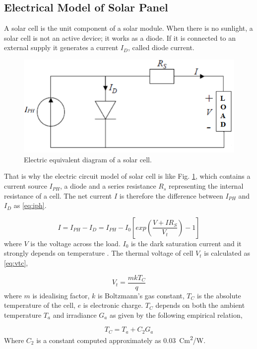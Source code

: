 \documentclass[journal]{IEEEtran/IEEEtran}
\newcommand{\figref}[1]{Fig. \ref{#1}}
\begin{document}
	\subsection{Electrical Model of Solar Panel}
	A solar cell is the unit component of a solar module. When there is no sunlight, a solar cell is not an active device; it works as a diode. If it is connected to an external supply it generates a current $I_D$, called diode current.
	\begin{figure}[!b]
		\centering
		\includegraphics[width=\linewidth]{cell_electric.png}
		\caption{Electric equivalent diagram of a solar cell.}
		\label{fig:solarcell}
	\end{figure}
	That is why the electric circuit model of solar cell is like \figref{fig:solarcell}, which contains a current source $I_{PH}$, a diode and a series resistance $R_s$ representing the internal resistance of a cell. The net current $I$ is therefore the difference between $I_{PH}$ and $I_D$ as \eqref{eq:iph}.
	
	\begin{equation}
	\label{eq:iph}
	I = I_{PH}-I_D = I_{PH}-I_0\left[exp\left(\frac{V+IR_S}{V_t}\right)-1\right] 
	\end{equation}
	where $V$ is the voltage across the load. $I_0$ is the dark saturation current and it strongly depends on temperature \cite{lorenzo}. The thermal voltage of cell $V_t$ is calculated as \eqref{eq:vtc},
	
	\begin{equation}
	\label{eq:vtc}
	V_t = \frac{mkT_C}{q}
	\end{equation}
	where $m$ is idealising factor, $k$ is Boltzmann’s gas constant, $T_C$ is the absolute temperature of the cell, $e$ is electronic charge. $T_C$ depends on both the ambient temperature $T_a$ and irradiance $G_a$ as given by the following empirical relation,
	
	\begin{equation}
	\label{eq:tc}
	T_C = T_a + C_2G_a
	\end{equation}
	Where $C_2$ is a constant computed approximately as 0.03~Cm\textsuperscript{2}/W.
	
\end{document}
